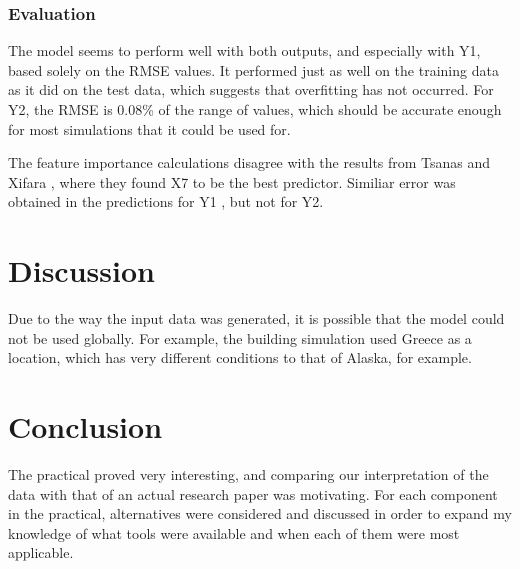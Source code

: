 \documentclass[12pt]{article}
\begin{document}
\section{Evaluation}

The model seems to perform well with both outputs, and especially with Y1, based solely on the RMSE values. It performed just as well on the training data as it did on the test data, which suggests that overfitting has not occurred. For Y2, the RMSE is 0.08\% of the range of values, which should be accurate enough for most simulations that it could be used for. 

The feature importance calculations disagree with the results from Tsanas and Xifara \cite{tsanas_xifara_2012}, where they found X7 to be the best predictor. Similiar error was obtained in the predictions for Y1 , but not for Y2. 

\part{Discussion}

Due to the way the input data was generated, it is possible that the model could not be used globally. For example, the building simulation used Greece as a location, which has very different conditions to that of Alaska, for example. 

\part{Conclusion}

The practical proved very interesting, and comparing our interpretation of the data with that of an actual research paper was motivating. For each component in the practical, alternatives were considered and discussed in order to expand my knowledge of what tools were available and when each of them were most applicable. 

\pagebreak



\end{document}
